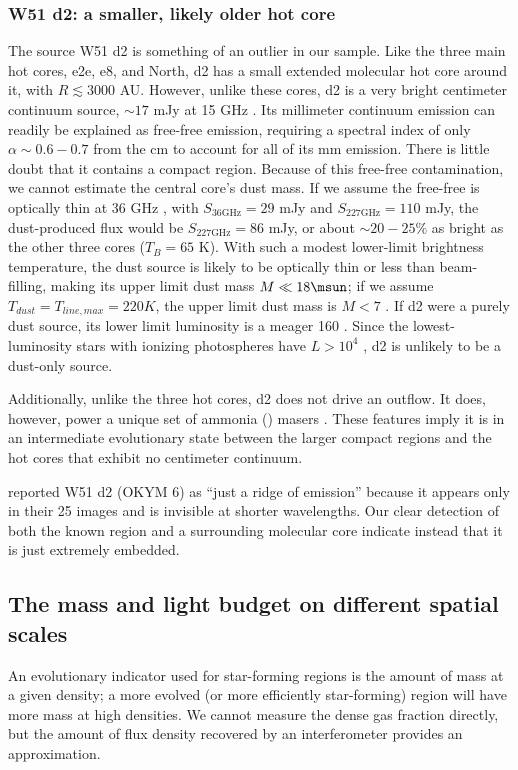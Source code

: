 \documentclass[twocolumn]{aastex61}
\begin{document}
\subsubsection{W51 d2: a smaller, likely older hot core}
\label{sec:w51d2}
The source W51 d2 is something of an outlier in our sample.  Like the three
main hot cores, e2e, e8, and North, d2 has a small extended molecular hot core
around it, with $R\lesssim3000$ AU.  However, unlike these cores, d2 is a very
bright centimeter continuum source, $\sim17$ mJy at 15 GHz
\citep{Ginsburg2016a}.  Its millimeter continuum emission can readily be
explained as free-free emission, requiring a spectral index of only
$\alpha\sim0.6-0.7$ from the cm to account for all of its mm emission.  There
is little doubt that it contains a compact \hii region.  Because of this free-free
contamination, we cannot estimate the central core's dust mass.  If we assume
the free-free is optically thin at 36 GHz \citep[the highest-frequency cm-wave
measurement
we have available][]{Goddi2015a}, with $S_{36 \mathrm{GHz}} = 29$ mJy and
$S_{227 \mathrm{GHz}}=110$
mJy, the dust-produced flux would be $S_{227 \mathrm{GHz}} = 86$ mJy, or about
$\sim20-25\%$ as bright as the other three cores ($T_{B}=65$ K).  With such a modest
lower-limit brightness temperature, the dust source is likely to be optically
thin or less than beam-filling, making its upper limit dust mass 
$M\ll18\msun$; if we assume $T_{dust} = T_{line,max} = 220 K$, the upper limit
dust mass is $M<7$ \msun.  If d2 were a purely dust source, its lower limit
luminosity is a meager 160 \lsun.  Since the lowest-luminosity 
stars with ionizing photospheres have $L>10^4$ \lsun, d2 is unlikely to be a
dust-only source.

Additionally, unlike the three hot cores, d2 does not drive an outflow.  It
does, however, power a unique set of ammonia (\ammonia) masers \citep[][Wootten
\& Wilson in prep]{Gaume1993a,Wilson1990a,Zhang1995a,Henkel2013a,Goddi2015a}.  These
features imply it is in an intermediate evolutionary state between the larger
compact \hii regions and the hot cores that exhibit no centimeter continuum.

\citet{Barbosa2016a} reported W51 d2 (OKYM 6) as ``just a ridge of emission''
because it appears only in their 25 \um images and is invisible at shorter
wavelengths.  Our clear detection of both the known \hchii region and a
surrounding molecular core indicate instead that it is just extremely embedded.


\subsection{The mass and light budget on different spatial scales}
\label{sec:massbudget}
An evolutionary indicator used for star-forming regions is the amount of mass
at a given density; a more evolved (or more efficiently star-forming) region will
have more mass at high densities.  We cannot measure the dense gas fraction
directly, but the amount of flux density recovered by an interferometer
provides an approximation.
\end{document}
